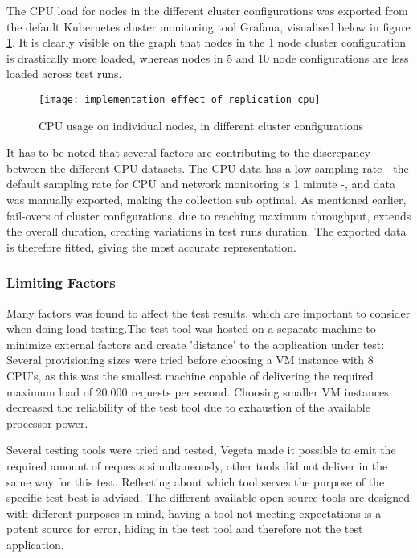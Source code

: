 The CPU load for nodes in the different cluster configurations was exported from the default Kubernetes cluster monitoring tool Grafana, visualised below in figure \ref{fig:implementation_effect_of_replication_cpu}. It is clearly visible on the graph that nodes in the 1 node cluster configuration is drastically more loaded, whereas nodes in 5 and 10 node configurations are less loaded across test runs.

\begin{figure}[!htb]
  \texttt{[image: implementation\_effect\_of\_replication\_cpu]}  
  \caption{CPU usage on individual nodes, in different cluster configurations}
  \label{fig:implementation_effect_of_replication_cpu}
\end{figure}

It has to be noted that several factors are contributing to the discrepancy between the different CPU datasets. The CPU data has a low sampling rate - the default sampling rate for CPU and network monitoring is 1 minute -, and data was manually exported, making the collection sub optimal. As mentioned earlier, fail-overs of cluster configurations, due to reaching maximum throughput, extends the overall duration, creating variations in test runs duration. The exported data is therefore fitted, giving the most accurate representation.

\subsubsection{Limiting Factors}
Many factors was found to affect the test results, which are important to consider when doing load testing.The test tool was hosted on a separate machine to minimize external factors and create 'distance' to the application under test: Several provisioning sizes were tried before choosing a VM instance with 8 CPU's, as this was the smallest machine capable of delivering the required maximum load of 20.000 requests per second. Choosing smaller VM instances decreased the reliability of the test tool due to exhaustion of the available processor power.

Several testing tools were tried and tested, Vegeta made it possible to emit the required amount of requests simultaneously, other tools did not deliver in the same way for this test. Reflecting about which tool serves the purpose of the specific test best is advised. The different available open source tools are designed with different purposes in mind, having a tool not meeting expectations is a potent source for error, hiding in the test tool and therefore not the test application.


